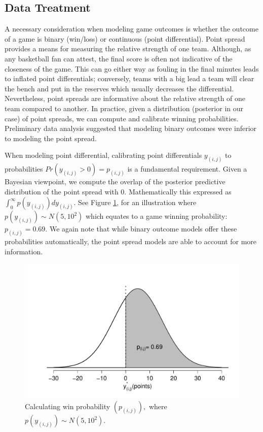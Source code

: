 \documentclass[letterpaper,12pt]{article}
\begin{document}
\subsection{Data Treatment}
A necessary consideration when modeling game outcomes is whether the outcome of a game is binary (win/loss) or continuous (point differential). Point spread provides a means for measuring the relative strength of one team. Although, as any basketball fan can attest, the final score is often not indicative of the closeness of the game. This can go either way as fouling in the final minutes leads to inflated point differentials; conversely, teams with a big lead a team will clear the bench and put in the reserves which usually decreases the differential. Nevertheless, point spreads are informative about the relative strength of one team compared to another. In practice, given a distribution (posterior in our case) of point spreads, we can compute and calibrate winning probabilities. Preliminary data analysis suggested that modeling binary outcomes were inferior to modeling the point spread. 

When modeling point differential, calibrating point differentials $y_{(i,j)}$ to probabilities $Pr(y_{(i,j)}>0)=p_{(i,j)}$ is a fundamental requirement. Given a Bayesian viewpoint, we compute the overlap of the posterior predictive distribution of the point spread with 0. Mathematically this expressed as $\int_0^\infty p(y_{(i,j)})dy_{(i,j)}$. See Figure \ref{fig:winprob}, for an illustration where  $p(y_{(i,j)}) \sim N(5,10^2)$ which equates to a game winning probability: $p_{(i,j)}=0.69$.
We again note that while binary outcome models offer these probabilities automatically, the point spread models are able to account for more information. 
\begin{figure}[h!]
\centering
\includegraphics[width=.7\textwidth]{WinProb2.pdf}
\caption{Calculating win probability $(p_{(i,j)}),$ where $p(y_{(i,j)}) \sim N(5,10^2)$.}
\label{fig:winprob}
\end{figure} 
\end{document}

